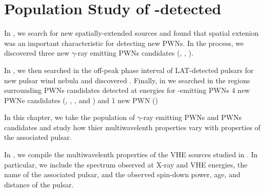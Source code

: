 \chapter{Population Study of -detected }


In , we search for new spatially-extended \fermi
sources and found that spatial extenion was an important characteristic
for detecting new \acp{PWN}. In the process, we discovered three
new $\gamma$-ray emitting \acp{PWN} candidates
(, , ).

In , we then
searched in the off-peak phase interval of \ac{LAT}-detected pulsars
for new pulsar wind nebula and discovered \threecfiftyeight.  Finally,
in  we searched in the regions surrounding \acp{PWN}
candidates detected at \tev energies for \gev-emitting \acp{PWN}
4 new PWNe candidates (, , ,
and ) and 1 new PWN ()

In this chapter, we take the population of $\gamma$-ray emitting \acp{PWN}
and \acp{PWN} candidates and study how thier multiwavelenth properties
vary with properties of the associated pulsar.




In , we compile the multiwavelenth
properties of the \ac{VHE} sources studied in . In
particular, we include the spectrum observed at X-ray and \ac{VHE}
energies, the name of the associated pulsar, and the observed spin-down
power, age, and distance of the pulsar.



